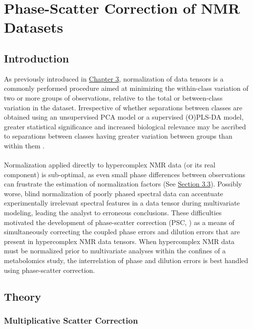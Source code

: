 
\chapter{Phase-Scatter Correction of NMR Datasets}

\section{Introduction}

\begin{doublespace}
As previously introduced in \hyperlink{chapter.3}{Chapter 3}, normalization
of data tensors is a commonly performed procedure aimed at minimizing the
within-class variation of two or more groups of observations, relative to
the total or between-class variation in the dataset. Irrespective of whether
separations between classes are obtained using an unsupervised PCA model or a
supervised (O)PLS-DA model, greater statistical significance and increased
biological relevance may be ascribed to separations between classes having
greater variation between groups than within them \cite{worley:abio2013}.
\\\\
Normalization applied directly to hypercomplex NMR data (or its real component)
is sub-optimal, as even small phase differences between observations can
frustrate the estimation of normalization factors
(See \hyperlink{section.3.3}{Section 3.3}). Possibly worse, blind
normalization of poorly phased spectral data can accentuate experimentally
irrelevant spectral features in a data tensor during multivariate modeling,
leading the analyst to erroneous conclusions. These difficulties motivated
the development of phase-scatter correction (PSC, \cite{worley:cils2014}) as
a means of simultaneously correcting the coupled phase errors and dilution
errors that are present in hypercomplex NMR data tensors. When hypercomplex
NMR data must be normalized prior to multivariate analyses within the confines
of a metabolomics study, the interrelation of phase and dilution errors is best
handled using phase-scatter correction.
\end{doublespace}

\section{Theory}

\subsection{Multiplicative Scatter Correction}

